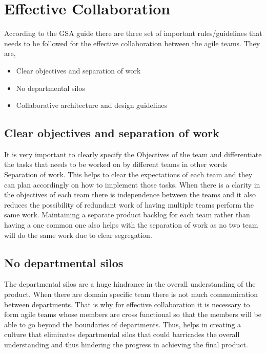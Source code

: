 \documentclass[sigconf]{acmart}
\begin{document}
\section{Effective Collaboration}

According to the GSA guide \cite{Gsa01} there are three set of important rules/guidelines that needs to be followed for the effective collaboration between the agile teams. They are,

\begin{itemize}
  \item Clear objectives and separation of work
  \item No departmental silos
  \item Collaborative architecture and design guidelines
\end{itemize}
\subsection{Clear objectives and separation of work}

It is very important to clearly specify the Objectives of the team and differentiate the tasks that needs to be worked on by different teams in other words Separation of work. This helps to clear the expectations of each team and they can plan accordingly on how to implement those tasks. When there is a clarity in the objectives of each team there is independence between the teams and it also reduces the possibility of redundant work of having multiple teams perform the same work. Maintaining a separate product backlog for each team rather than having a one common one also helps with the separation of work as no two team will do the same work due to clear segregation. 

\subsection{No departmental silos}
The departmental silos are a huge hindrance in the overall understanding of the product. When there are domain specific team there is not much communication between departments. That is why for effective collaboration it is necessary to form agile teams whose members are cross functional so that the members will be able to go beyond the boundaries of departments. Thus, helps in creating a culture that eliminates departmental silos that could barricades the overall understanding and thus hindering the progress in achieving the final product.
\end{document}
